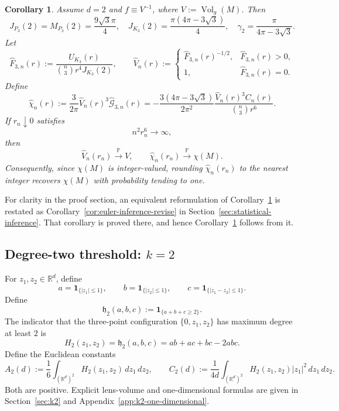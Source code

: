 \documentclass[11pt]{article}
\newtheorem{corollary}[theorem]{Corollary}
\theoremstyle{remark}
\newcommand{\R}{\mathbb R}
\newcommand{\Vol}{\operatorname{Vol}}
\newcommand{\ind}{\mathbf 1}
\newcommand{\Pp}{\mathbb P}
\numberwithin{equation}{section}
\begin{document}
\begin{corollary}
\label{cor:euler-inference}
Assume $d=2$ and $f\equiv V^{-1}$, where
$V:=\Vol_g(M)$.  Then
\[
J_{P_3}(2)=M_{P_3}(2)=\frac{9\sqrt3\pi}{4},
\quad
J_{K_3}(2)=\frac{\pi(4\pi-3\sqrt3)}4,
\quad
\gamma_2=\frac{\pi}{4\pi-3\sqrt3}.
\]
Let
\[
\widehat F_{3,n}(r)
:=\frac{U_{K_3}(r)}
{\binom n3 r^4J_{K_3}(2)},
\qquad
\widehat V_n(r):=
\begin{cases}
\widehat F_{3,n}(r)^{-1/2},
&\widehat F_{3,n}(r)>0,\\
1,
&\widehat F_{3,n}(r)=0.
\end{cases}
\]
Define
\begin{equation}
\widehat\chi_n(r)
:=\frac{3}{2\pi}\widehat V_n(r)^3
\widehat{\mathcal G}_{3,n}(r)
=-\frac{3(4\pi-3\sqrt3)}{2\pi^2}
\frac{\widehat V_n(r)^3C_n(r)}
{\binom n3r^6}.
\label{eq:euler-estimator}
\end{equation}
If $r_n\downarrow0$ satisfies
\begin{equation}
n^2r_n^6\rightarrow\infty,
\label{eq:surface-consistency-bandwidth}
\end{equation}
then
\[
\widehat V_n(r_n)\xrightarrow{\Pp}V,
\qquad
\widehat\chi_n(r_n)\xrightarrow{\Pp}\chi(M).
\]
Consequently, since $\chi(M)$ is integer-valued, rounding
$\widehat\chi_n(r_n)$ to the nearest integer recovers $\chi(M)$
with probability tending to one.
\end{corollary}

For clarity in the proof section, an equivalent reformulation of
Corollary~\ref{cor:euler-inference} is restated as
Corollary~\ref{cor:euler-inference-revise} in
Section~\ref{sec:statistical-inference}.  That corollary is proved there,
and hence Corollary~\ref{cor:euler-inference} follows from it.


\subsection{Degree-two threshold: \texorpdfstring{$k=2$}{k=2}}
\label{subsec:k2-statement}

For $z_1,z_2\in\R^d$, define
\[
a=\ind_{\{|z_1|\le1\}},
\qquad
b=\ind_{\{|z_2|\le1\}},
\qquad
c=\ind_{\{|z_1-z_2|\le1\}}.
\]
Define
\[
\mathfrak h_2(a,b,c):=\ind_{\{a+b+c\ge2\}}.
\]
The indicator that the three-point configuration
$\{0,z_1,z_2\}$ has maximum degree at least $2$ is
\[
H_2(z_1,z_2)
=\mathfrak h_2(a,b,c)
=ab+ac+bc-2abc.
\]
Define the Euclidean constants
\[
A_2(d)
:=\frac16\int_{(\mathbb R^d)^2}
H_2(z_1,z_2)\,dz_1\,dz_2,
\qquad
C_2(d)
:=\frac1{4d}\int_{(\mathbb R^d)^2}
H_2(z_1,z_2)|z_1|^2\,dz_1\,dz_2.
\]
Both are positive.  Explicit lens-volume and one-dimensional formulas are
given in Section~\ref{sec:k2} and
Appendix~\ref{app:k2-one-dimensional}.
\end{document}
